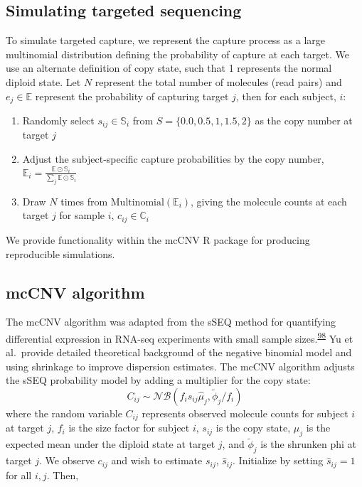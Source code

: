 \documentclass[11pt,letterpaper]{book}
\begin{document}
\hypertarget{simulating-targeted-sequencing}{%
\subsection{Simulating targeted sequencing}\label{simulating-targeted-sequencing}}

To simulate targeted capture, we represent the capture process as a large multinomial distribution defining the probability of capture at each target.
We use an alternate definition of copy state, such that 1 represents the normal diploid state.
Let \(N\) represent the total number of molecules (read pairs) and \(e_j \in \mathbb{E}\) represent the probability of capturing target \(j\), then for each subject, \(i\):

\begin{enumerate}
\def\labelenumi{\arabic{enumi}.}
\item
  Randomly select \(s_{ij} \in \mathbb{S}_i\) from \(S = \{0.0, 0.5, 1, 1.5, 2\}\) as the copy number at target \(j\)
\item
  Adjust the subject-specific capture probabilities by the copy number, \(\mathbb{E}_i = \frac{\mathbb{E} \odot \mathbb{S}_{i}}{\sum_j \mathbb{E} \odot \mathbb{S}_{i}}\)
\item
  Draw \(N\) times from \(\text{Multinomial}(\mathbb{E}_i)\), giving the molecule counts at each target \(j\) for sample \(i\), \(c_{ij} \in \mathbb{C}_i\)
\end{enumerate}

We provide functionality within the mcCNV R package for producing reproducible simulations.

\hypertarget{mccnv-algorithm}{%
\subsection{mcCNV algorithm}\label{mccnv-algorithm}}

The mcCNV algorithm was adapted from the sSEQ method for quantifying differential expression in RNA-seq experiments with small sample sizes.\textsuperscript{\protect\hyperlink{ref-yu:2013aa}{98}}
Yu et al.~provide detailed theoretical background of the negative binomial model and using shrinkage to improve dispersion estimates.
The mcCNV algorithm adjusts the sSEQ probability model by adding a multiplier for the copy state:
\[
  C_{ij} \sim \mathcal{NB}(f_is_{ij}\hat\mu_j, \tilde\phi_j/f_i)
\]
where the random variable \(C_{ij}\) represents observed molecule counts for subject \(i\) at target \(j\), \(f_i\) is the size factor for subject \(i\), \(s_{ij}\) is the copy state, \(\mu_j\) is the expected mean under the diploid state at target \(j\), and \(\tilde\phi_j\) is the shrunken phi at target \(j\).
We observe \(c_{ij}\) and wish to estimate \(s_{ij}\), \(\hat{s}_{ij}\).
Initialize by setting \(\hat{s}_{ij} = 1\) for all \(i,j\). Then,
\end{document}
